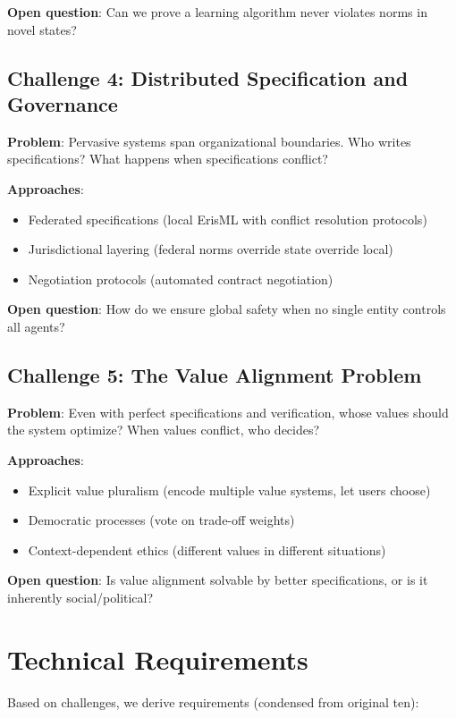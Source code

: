 \documentclass[conference]{IEEEtran}
\begin{document}
\textbf{Open question}: Can we prove a learning algorithm never violates
norms in novel states?

\subsection{Challenge 4: Distributed Specification and Governance}

\textbf{Problem}: Pervasive systems span organizational boundaries. Who
writes specifications? What happens when specifications conflict?

\textbf{Approaches}:
\begin{itemize}
\item Federated specifications (local ErisML with conflict resolution protocols)
\item Jurisdictional layering (federal norms override state override local)
\item Negotiation protocols (automated contract negotiation)
\end{itemize}

\textbf{Open question}: How do we ensure global safety when no single
entity controls all agents?

\subsection{Challenge 5: The Value Alignment Problem}

\textbf{Problem}: Even with perfect specifications and verification,
whose values should the system optimize? When values conflict, who
decides?

\textbf{Approaches}:
\begin{itemize}
\item Explicit value pluralism (encode multiple value systems, let users choose)
\item Democratic processes (vote on trade-off weights)
\item Context-dependent ethics (different values in different situations)
\end{itemize}

\textbf{Open question}: Is value alignment solvable by better
specifications, or is it inherently social/political?

\section{Technical Requirements}
\label{sec:requirements}

Based on challenges, we derive requirements (condensed from original ten):
\end{document}
